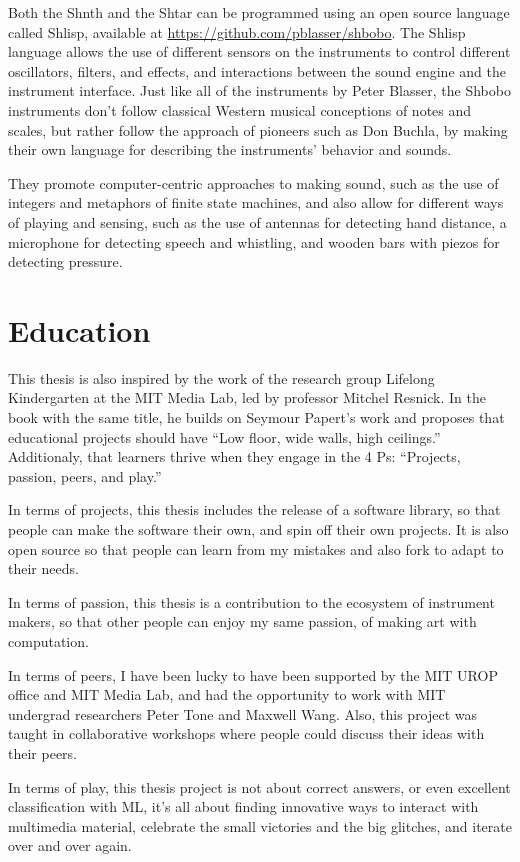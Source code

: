 Both the Shnth and the Shtar can be programmed using an open source language called Shlisp, available at \url{https://github.com/pblasser/shbobo}. The Shlisp language allows the use of different sensors on the instruments to control different oscillators, filters, and effects, and interactions between the sound engine and the instrument interface. Just like all of the instruments by Peter Blasser, the Shbobo instruments don't follow classical Western musical conceptions of notes and scales, but rather follow the approach of pioneers such as Don Buchla, by making their own language for describing the instruments' behavior and sounds.

They promote computer-centric approaches to making sound, such as the use of integers and metaphors of finite state machines, and also allow for different ways of playing and sensing, such as the use of antennas for detecting hand distance, a microphone for detecting speech and whistling, and wooden bars with piezos for detecting pressure.

\section{Education}

This thesis is also inspired by the work of the research group Lifelong Kindergarten at the MIT Media Lab, led by professor Mitchel Resnick. In the book with the same title, he builds on Seymour Papert’s work and proposes that educational projects should have “Low floor, wide walls, high ceilings.” Additionaly, that learners thrive when they engage in the 4 Ps: “Projects, passion, peers, and play.”

In terms of projects, this thesis includes the release of a software library, so that people can make the software their own, and spin off their own projects. It is also open source so that people can learn from my mistakes and also \gls{fork} to adapt to their needs.

In terms of passion, this thesis is a contribution to the ecosystem of instrument makers, so that other people can enjoy my same passion, of making art with computation.

In terms of peers, I have been lucky to have been supported by the MIT UROP office and MIT Media Lab, and had the opportunity to work with MIT undergrad researchers Peter Tone and Maxwell Wang. Also, this project was taught in collaborative workshops where people could discuss their ideas with their peers.

In terms of play, this thesis project is not about correct answers, or even excellent classification with \acrshort{ML}, it's all about finding innovative ways to interact with multimedia material, celebrate the small victories and the big glitches, and iterate over and over again.

